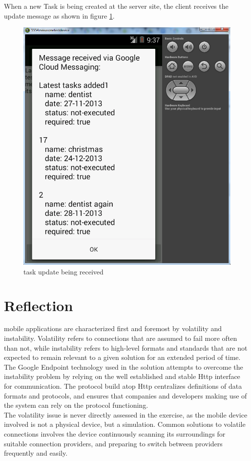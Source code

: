 \pagebreak
When a new Task is being created at the server site, the client receives the update message as shown in figure \ref{mobile_task_update_figure}.

\begin{figure}[H]
	\centering
	\includegraphics[scale=0.7]{images/googlecloud__tasksindevice.png}
	\caption{task update being received}
	\label{mobile_task_update_figure}
\end{figure}



\section{Reflection}

mobile applications are characterized first and foremost by volatility and instability. Volatility refers to connections that are assumed to fail more often than not, while instability refers to high-level formats and standards that are not expected to remain relevant to a given solution for an extended period of time. The Google Endpoint technology used in the solution attempts to overcome the instability problem by relying on the well established and stable Http interface for communication. The protocol build atop Http centralizes definitions of data formats and protocols, and ensures that companies and developers making use of the system can rely on the protocol functioning.\\
The volatility issue is never directly assessed in the exercise, as the mobile device involved is not a physical device, but a simulation. Common solutions to volatile connections involves the device continuously scanning its surroundings for suitable connection providers, and preparing to switch between providers frequently and easily.\\\\

